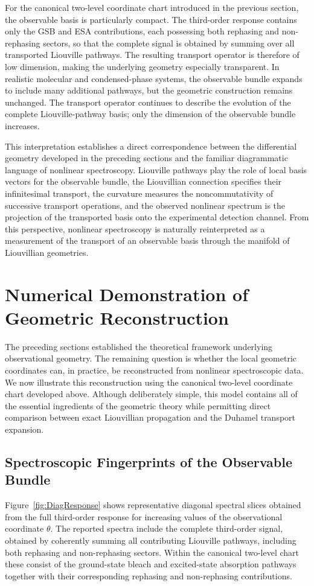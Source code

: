 For the canonical two-level coordinate chart introduced in the
previous section, the observable basis is particularly compact.
The third-order response contains only the GSB and ESA
contributions, each possessing both rephasing and non-rephasing
sectors, so that the complete signal is obtained by summing over
all transported Liouville pathways. The resulting transport
operator is therefore of low dimension, making the underlying
geometry especially transparent. In realistic molecular and
condensed-phase systems, the observable bundle expands to include
many additional pathways, but the geometric construction remains
unchanged. The transport operator continues to describe the
evolution of the complete Liouville-pathway basis; only the
dimension of the observable bundle increases.

This interpretation establishes a direct correspondence between
the differential geometry developed in the preceding sections and
the familiar diagrammatic language of nonlinear spectroscopy.
Liouville pathways play the role of local basis vectors for the
observable bundle, the Liouvillian connection specifies their
infinitesimal transport, the curvature measures the
noncommutativity of successive transport operations, and the
observed nonlinear spectrum is the projection of the transported
basis onto the experimental detection channel. From this
perspective, nonlinear spectroscopy is naturally reinterpreted as
a measurement of the transport of an observable basis through the
manifold of Liouvillian geometries.


\section{Numerical Demonstration of Geometric Reconstruction}
\label{sec:numerics}
The preceding sections established the theoretical framework
underlying observational geometry. The remaining question is
whether the local geometric coordinates can, in practice, be
reconstructed from nonlinear spectroscopic data. We now
illustrate this reconstruction using the canonical two-level
coordinate chart developed above. Although deliberately simple,
this model contains all of the essential ingredients of the
geometric theory while permitting direct comparison between exact
Liouvillian propagation and the Duhamel transport expansion.



\subsection{Spectroscopic Fingerprints of the Observable Bundle}
Figure~\ref{fig:DiagResponse} shows representative diagonal
spectral slices obtained from the full third-order response for
increasing values of the observational coordinate $\theta$. The
reported spectra include the complete third-order signal,
obtained by coherently summing all contributing Liouville
pathways, including both rephasing and non-rephasing sectors.
Within the canonical two-level chart these consist of the
ground-state bleach and excited-state absorption pathways
together with their corresponding rephasing and non-rephasing
contributions.

